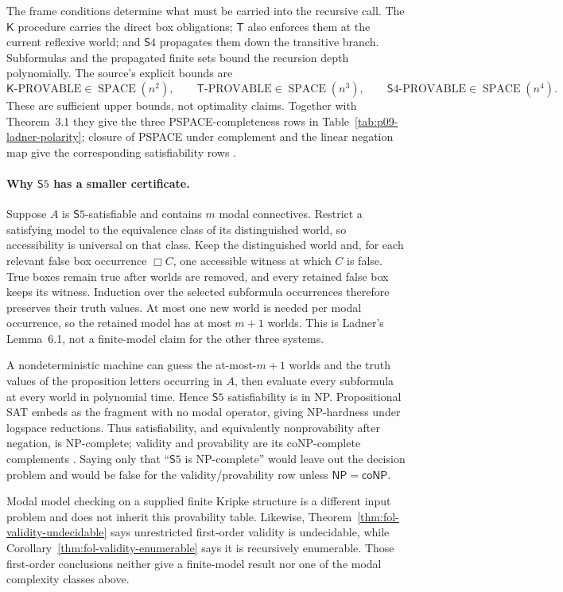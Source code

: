 The frame conditions determine what must be carried into the recursive call.
The \(\mathsf K\) procedure carries the direct box obligations;
\(\mathsf T\) also enforces them at the current reflexive world; and
\(\mathsf S4\) propagates them down the transitive branch.  Subformulas and the
propagated finite sets bound the recursion depth polynomially.  The source's
explicit bounds are
\[
 \mathsf K\text{-PROVABLE}\in\operatorname{SPACE}(n^2),\qquad
 \mathsf T\text{-PROVABLE}\in\operatorname{SPACE}(n^3),\qquad
 \mathsf S4\text{-PROVABLE}\in\operatorname{SPACE}(n^4).
\]
These are sufficient upper bounds, not optimality claims.  Together with
Theorem~3.1 they give the three PSPACE-completeness rows in
Table~\ref{tab:p09-ladner-polarity}; closure of PSPACE under complement and the
linear negation map give the corresponding satisfiability rows
\cite[thm.~5.1 and cor.~5.2--5.3]{Ladner1977}.

\paragraph{Why \(\mathsf S5\) has a smaller certificate.}
Suppose \(A\) is \(\mathsf S5\)-satisfiable and contains \(m\) modal
connectives.  Restrict a satisfying model to the equivalence class of its
distinguished world, so accessibility is universal on that class.  Keep the
distinguished world and, for each relevant false box occurrence \(\Box C\),
one accessible witness at which \(C\) is false.  True boxes remain true after
worlds are removed, and every retained false box keeps its witness.  Induction
over the selected subformula occurrences therefore preserves their truth
values.  At most one new world is needed per modal occurrence, so the retained
model has at most \(m+1\) worlds.  This is Ladner's Lemma~6.1, not a finite-model
claim for the other three systems.

A nondeterministic machine can guess the at-most-\(m+1\) worlds and the truth
values of the proposition letters occurring in \(A\), then evaluate every
subformula at every world in polynomial time.  Hence \(\mathsf S5\)
satisfiability is in NP.  Propositional SAT embeds as the fragment with no modal
operator, giving NP-hardness under logspace reductions.  Thus satisfiability,
and equivalently nonprovability after negation, is NP-complete; validity and
provability are its coNP-complete complements
\cite[lem.~6.1 and thm.~6.2]{Ladner1977}.  Saying only that “\(\mathsf S5\) is
NP-complete” would leave out the decision problem and would be false for the
validity/provability row unless \(\mathsf{NP}=\mathsf{coNP}\).

Modal model checking on a supplied finite Kripke structure is a different input
problem and does not inherit this provability table.  Likewise,
Theorem~\ref{thm:fol-validity-undecidable} says unrestricted first-order
validity is undecidable, while
Corollary~\ref{thm:fol-validity-enumerable} says it is recursively enumerable.
Those first-order conclusions neither give a finite-model result nor one of the
modal complexity classes above.
